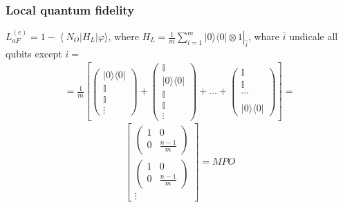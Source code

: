 \subsubsection{Local quantum fidelity}
$L_{a F}^{(e)}=1-\left\langle N_O\right| H_L|\varphi\rangle$, where $H_L=\left.\frac{1}{m} \sum_{i=1}^m|0\rangle\langle 0| \otimes 1\right|_{\bar{i}}$, whare $\bar{i}$ undicale all qubits except $i=$
$$
\begin{aligned}
=\frac{1}{m}\left[\left(\begin{array}{c}
|0\rangle\langle 0| \\
\mathbb{I}  \\
\mathbb{I}  \\
\vdots
\end{array}\right)+\left(\begin{array}{c}
\mathbb{I} \\
|0\rangle\langle 0| \\
\mathbb{I}  \\
\mathbb{I}  \\
\vdots
\end{array}\right)+\ldots+\left(\begin{array}{c}
\mathbb{I} \\
\mathbb{I} \\
\cdots \\
\\
|0\rangle\langle 0|
\end{array}\right)\right]=
\end{aligned}
$$
\[
\left[
\begin{array}{c}
\left(\begin{array}{cc}
1 & 0 \\
0 & \frac{n-1}{m}
\end{array}\right) \\[10pt]
\left(\begin{array}{cc}
1 & 0 \\
0 & \frac{n-1}{m}
\end{array}\right) \\[10pt]
\vdots
\end{array}
\right] = MPO
\]
